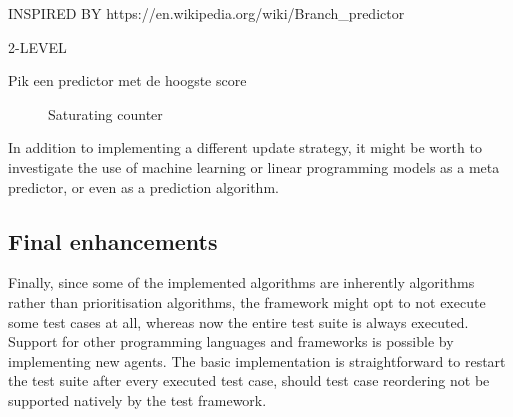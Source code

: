INSPIRED BY https://en.wikipedia.org/wiki/Branch\_predictor

2-LEVEL

Pik een predictor met de hoogste score

\begin{figure}[htbp!]
	\centering
	
	\caption{Saturating counter}
	\label{fig:saturating-counter}
\end{figure}

In addition to implementing a different update strategy, it might be worth to investigate the use of machine learning or linear programming models as a meta predictor, or even as a prediction algorithm.

\subsection{Final enhancements}
Finally, since some of the implemented algorithms are inherently \tsm{} algorithms rather than prioritisation algorithms, the framework might opt to not execute some test cases at all, whereas now the entire test suite is always executed.\\

\noindent Support for other programming languages and frameworks is possible by implementing new agents. The basic implementation is straightforward to restart the test suite after every executed test case, should test case reordering not be supported natively by the test framework.